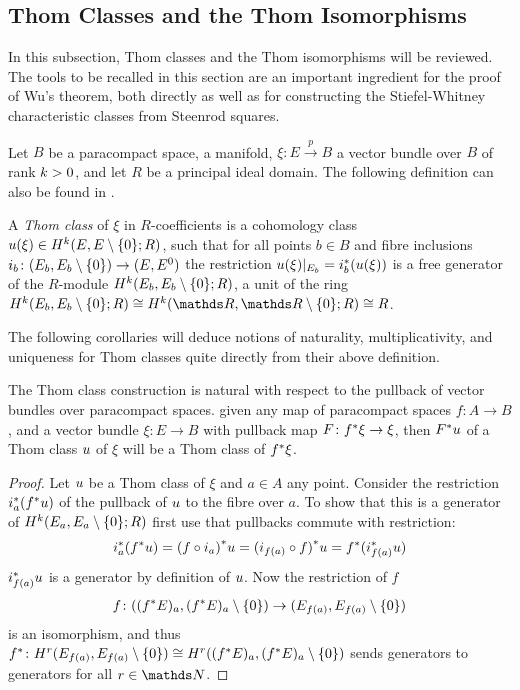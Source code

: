 \subsection{Thom Classes and the Thom Isomorphisms}\label{sec:thomclasses}
In this subsection, Thom classes and the Thom isomorphisms will be
reviewed. The tools to be recalled in this section are an important
ingredient for the proof of Wu's theorem, both directly as well as for
constructing the Stiefel-Whitney characteristic classes from Steenrod
squares.

Let $B$ be a paracompact space, \forexample a manifold,
$\xi\colon E\xrightarrow{p} B$ a vector bundle over $B$ of rank $k>0$,
and let $R$ be a principal ideal domain.
The following definition can \forexample also be found in
\cite[p.~441]{hatcher}.
\begin{Def}
  A \emph{Thom class} of $\xi$ in $R$-coefficients is a
  cohomology class ${u}(\xi)\in H^{k}(E, {E}\setminus\{0\}; R)$,
  such that for all points $b\in B$ and fibre inclusions
  $i_b\colon (E_b, {E_b}\setminus\{0\}) \to (E, {E}^0)$
  the restriction ${u}(\xi)|_{E_b} = {i}^*_b ({u}(\xi))$ is a
  free generator of the $R$-module $H^{k}(E_b, {E_b}\setminus\{0\}; R)$,
  \idest a unit
  of the ring
  $\H^{\rkk}(\spherepair{E_b};R)\cong \H^{\rkk}(\spherepair{\R}; R)\cong R$.
\end{Def}

The following corollaries will deduce notions of naturality,
multiplicativity, and uniqueness for Thom classes quite directly from
their above definition.

\begin{Cor}\label{cor:thomclsnatural}
  The Thom class construction is natural with respect to the pullback
  of vector bundles over paracompact spaces.
  \Idest given any map of paracompact spaces $f\colon A\to B$, and a
  vector bundle $\xi\colon E\to B$ with pullback map
  $F\colon{f}^*\xi\to\xi$,
  then ${F}^* u$ of a Thom class $u$ of $\xi$ will
  be a Thom class of ${f}^* \xi$.
  \begin{proof}
    Let $u$ be a Thom class of $\xi$ and $a\in A$ any point.
    Consider the restriction ${i}^*_a({f}^* u)$
    of the pullback of $u$ to the fibre over $a$. To show that this
    is a generator of $H^{k}(E_a, {E_a}\setminus\{0\};R)$ first use that
    pullbacks commute with restriction:
    \begin{gather*}
      {i}^*_a({f}^* u)
      = {(f\circ i_a)}^* u
      = {(i_{f(a)}\circ f)}^* u
      = {f}^* ({i}^*_{f(a)} u)
    \end{gather*}
    ${i}^*_{f(a)} u$ is a generator by definition of $u$.
    Now the restriction of $f$
    \begin{gather*}
      f\colon (({f}^* E)_a, {({f}^* E)_a}\setminus\{0\}) \to (E_{f(a)}, {E_{f(a)}}\setminus\{0\})
    \end{gather*}
    is an isomorphism, and thus
    ${f}^*\colon H^r(E_{f(a)}, {E_{f(a)}}\setminus\{0\})
    \cong H^r(({f}^* E)_a, {({f}^* E)_a}\setminus\{0\})$
    sends generators to generators for all $r\in\Nat$.
  \end{proof}
\end{Cor}

